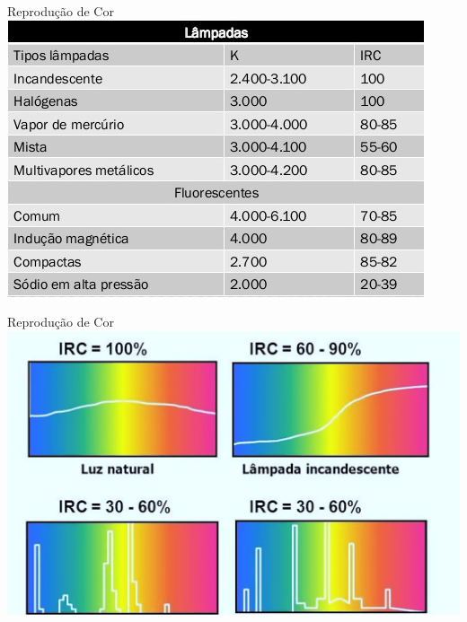 \begin{frame}{Reprodução de Cor}
	\centering
	\includegraphics[width=0.9\linewidth]{Figuras/Ch07/fig7}
\end{frame}


\begin{frame}{Reprodução de Cor}
	\centering
	\includegraphics[width=0.9\linewidth]{Figuras/Ch07/fig5.1}
\end{frame}


